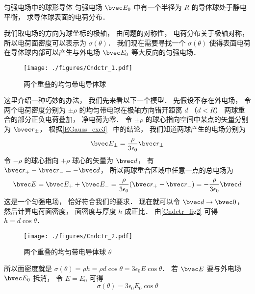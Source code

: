 \begin{example}{匀强电场中的球形导体}
匀强电场 $\bvec E_0$ 中有一个半径为 $R$ 的导体球处于静电平衡， 求导体球表面的电荷分布．

我们取电场的方向为球坐标的极轴， 由问题的对称性， 电荷分布关于极轴对称， 所以电荷面密度可以表示为 $\sigma(\theta)$． 我们现在需要寻找一个 $\sigma(\theta)$ 使得表面电荷在导体球内部可以产生与外电场 $\bvec E_0$ 等大反向的匀强电场．

\begin{figure}[ht]
\centering
\texttt{[image: ./figures/Cndctr\_1.pdf]}
\caption{两个重叠的均匀带电导体球} \label{Cndctr_fig1}
\end{figure}

这里介绍一种巧妙的办法， 我们先来看以下一个模型． 先假设不存在外电场， 令两个电荷密度分别为 $\pm\rho$ 的均匀带电球在极轴方向错开距离 $d$ （$d < R$） 两球重合的部分正负电荷叠加， 净电荷为零． 令 $\pm\rho$ 的球心指向空间中某点的矢量分别为 $\bvec r_\pm$， 根据\autoref{EGauss_exe3}~ 中的结论， 我们知道两球产生的电场分别为
\begin{equation}
\bvec E_\pm = \frac{\rho}{3\epsilon_0}\bvec r_\pm
\end{equation}
令 $-\rho$ 的球心指向 $+\rho$ 球心的矢量为 $\bvec d$， 有 $\bvec r_+ - \bvec r_- = -\bvec d$， 所以两球重合区域中任意一点的总电场为
\begin{equation}
\bvec E = \bvec E_+ + \bvec E_- = \frac{\rho}{3\epsilon_0}(\bvec r_+ - \bvec r_-) = -\frac{\rho}{3\epsilon_0}\bvec d
\end{equation}
这是一个匀强电场， 恰好符合我们的要求． 现在就可以令 $\bvec d\to \bvec 0$， 然后计算电荷面密度， 面密度与厚度 $h$ 成正比． 由\autoref{Cndctr_fig2} 可得 $h = d\cos\theta$．

\begin{figure}[ht]
\centering
\texttt{[image: ./figures/Cndctr\_2.pdf]}
\caption{两个重叠的均匀带电导体球 $\theta$} \label{Cndctr_fig2}
\end{figure}

所以面密度就是 $\sigma(\theta) = \rho h = \rho d\cos\theta = 3\epsilon_0 E \cos\theta$． 若 $\bvec E$ 要与外电场 $\bvec E_0$ 抵消， 令 $E = E_0$ 可得
\begin{equation}
\sigma(\theta) = 3\epsilon_0 E_0 \cos\theta
\end{equation}
\end{example}

